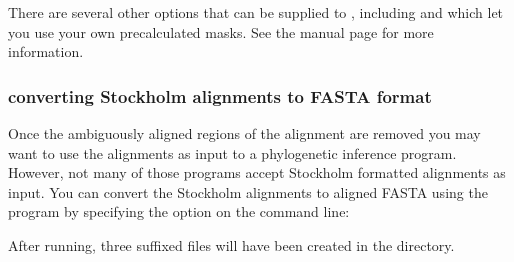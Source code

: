 There are several other options that can be supplied to
, including  and  which let you 
use your own precalculated masks. See the 
manual page for more information. 

\subsubsection{converting Stockholm alignments to FASTA format}
Once the ambiguously aligned regions of the alignment are removed you may
want to use the alignments as input to a phylogenetic inference
program. However, not many of those programs accept Stockholm formatted
alignments as input. You can convert the Stockholm alignments to aligned FASTA
using the  program by specifying the 
option on the command line:


After running, three  suffixed files will have been created
in the  directory.





